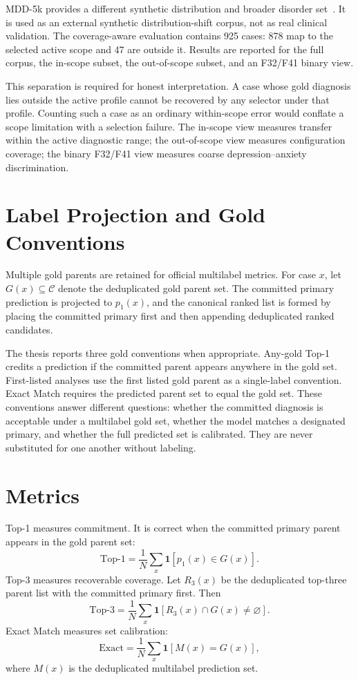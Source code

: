 MDD-5k provides a different synthetic distribution and broader disorder set~\citep{yin2024mdd5k}. It is used as an external synthetic distribution-shift corpus, not as real clinical validation. The coverage-aware evaluation contains 925 cases: 878 map to the selected active scope and 47 are outside it. Results are reported for the full corpus, the in-scope subset, the out-of-scope subset, and an F32/F41 binary view.

This separation is required for honest interpretation. A case whose gold diagnosis lies outside the active profile cannot be recovered by any selector under that profile. Counting such a case as an ordinary within-scope error would conflate a scope limitation with a selection failure. The in-scope view measures transfer within the active diagnostic range; the out-of-scope view measures configuration coverage; the binary F32/F41 view measures coarse depression--anxiety discrimination.

\section{Label Projection and Gold Conventions}

Multiple gold parents are retained for official multilabel metrics. For case $x$, let $G(x)\subseteq\mathcal{C}$ denote the deduplicated gold parent set. The committed primary prediction is projected to $p_1(x)$, and the canonical ranked list is formed by placing the committed primary first and then appending deduplicated ranked candidates.

The thesis reports three gold conventions when appropriate. Any-gold Top-1 credits a prediction if the committed parent appears anywhere in the gold set. First-listed analyses use the first listed gold parent as a single-label convention. Exact Match requires the predicted parent set to equal the gold set. These conventions answer different questions: whether the committed diagnosis is acceptable under a multilabel gold set, whether the model matches a designated primary, and whether the full predicted set is calibrated. They are never substituted for one another without labeling.

\section{Metrics}

Top-1 measures commitment. It is correct when the committed primary parent appears in the gold parent set:
\[
\mathrm{Top\text{-}1}=\frac{1}{N}\sum_x \mathbf{1}[p_1(x)\in G(x)].
\]
Top-3 measures recoverable coverage. Let $R_3(x)$ be the deduplicated top-three parent list with the committed primary first. Then
\[
\mathrm{Top\text{-}3}=\frac{1}{N}\sum_x \mathbf{1}[R_3(x)\cap G(x)\neq\varnothing].
\]
Exact Match measures set calibration:
\[
\mathrm{Exact}=\frac{1}{N}\sum_x \mathbf{1}[M(x)=G(x)],
\]
where $M(x)$ is the deduplicated multilabel prediction set.

